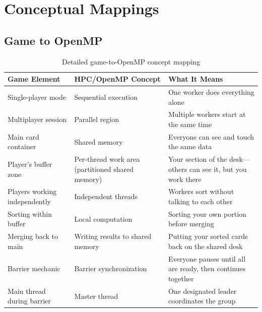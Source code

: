 
\section{Conceptual Mappings}
\label{app:d:conceptual-mappings}

\subsection{Game to OpenMP}

\begin{table}[htbp]
    \centering
    \caption{Detailed game-to-OpenMP concept mapping}
    \begin{tabular}{@{}p{4cm}p{5cm}p{5cm}@{}}
        \toprule
        \textbf{Game Element}         & \textbf{HPC/OpenMP Concept}                      & \textbf{What It Means}                                           \\
        \midrule
        Single-player mode            & Sequential execution                             & One worker does everything alone                                 \\
        Multiplayer session           & Parallel region                                  & Multiple workers start at the same time                          \\
        Main card container           & Shared memory                                    & Everyone can see and touch the same data                         \\
        Player's buffer zone          & Per-thread work area (partitioned shared memory) & Your section of the desk---others can see it, but you work there \\
        Players working independently & Independent threads                              & Workers sort without talking to each other                       \\
        Sorting within buffer         & Local computation                                & Sorting your own portion before merging                          \\
        Merging back to main          & Writing results to shared memory                 & Putting your sorted cards back on the shared desk                \\
        Barrier mechanic              & Barrier synchronization                          & Everyone pauses until all are ready, then continues together     \\
        Main thread during barrier    & Master thread                                    & One designated leader coordinates the group                      \\
        \bottomrule
    \end{tabular}
\end{table}


